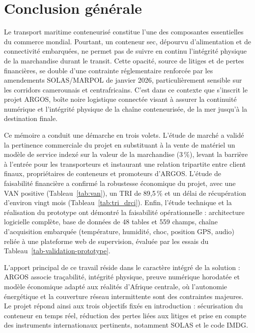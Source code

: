 \chapter*{Conclusion générale}

Le transport maritime conteneurisé constitue l'une des composantes essentielles du commerce mondial\cite{unctad2025}. Pourtant, un conteneur sec, dépourvu d'alimentation et de connectivité embarquées, ne permet pas de suivre en continu l'intégrité physique de la marchandise durant le transit. Cette opacité, source de litiges et de pertes financières, se double d'une contrainte réglementaire renforcée par les amendements SOLAS/MARPOL de janvier 2026\cite{omi2026}, particulièrement sensible sur les corridors camerounais et centrafricains\cite{corridor_transit,logcluster}. C'est dans ce contexte que s'inscrit le projet ARGOS, boîte noire logistique connectée visant à assurer la continuité numérique et l'intégrité physique de la chaîne conteneurisée, de la mer jusqu'à la destination finale.

Ce mémoire a conduit une démarche en trois volets. L'étude de marché a validé la pertinence commerciale du projet en substituant à la vente de matériel un modèle de service indexé sur la valeur de la marchandise (3\,\%), levant la barrière à l'entrée pour les transporteurs et instaurant une relation tripartite entre client finaux, propriétaires de conteneurs et promoteurs d'ARGOS. L'étude de faisabilité financière a confirmé la robustesse économique du projet, avec une VAN positive (Tableau~\ref{tab:van}), un TRI de 89,5\,\% et un délai de récupération d'environ vingt mois (Tableau~\ref{tab:tri_drci}). Enfin, l'étude technique et la réalisation du prototype ont démontré la faisabilité opérationnelle : architecture logicielle complète, base de données de 48 tables et 559 champs, chaîne d'acquisition embarquée (température, humidité, choc, position GPS, audio) reliée à une plateforme web de supervision, évaluée par les essais du Tableau~\ref{tab-validation-prototype}.

L'apport principal de ce travail réside dans le caractère intégré de la solution : ARGOS associe traçabilité, intégrité physique, preuve numérique horodatée et modèle économique adapté aux réalités d'Afrique centrale, où l'autonomie énergétique et la couverture réseau intermittente sont des contraintes majeures. Le projet répond ainsi aux trois objectifs fixés en introduction : sécurisation du conteneur en temps réel, réduction des pertes liées aux litiges et prise en compte des instruments internationaux pertinents, notamment SOLAS et le code IMDG\cite{imo_solas,imo_imdg}.

